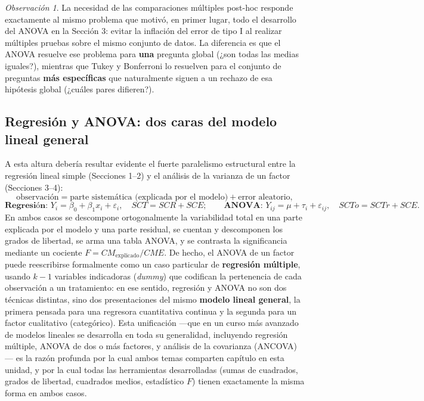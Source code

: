 \documentclass[11pt,a4paper]{article}
\theoremstyle{plain}
\theoremstyle{definition}
\theoremstyle{remark}
\newtheorem{observacion}[teorema]{Observación}
\begin{document}
\begin{observacion}
La necesidad de las comparaciones múltiples post-hoc responde exactamente al mismo problema que motivó, en primer lugar, todo el desarrollo del ANOVA en la Sección 3: evitar la inflación del error de tipo I al realizar múltiples pruebas sobre el mismo conjunto de datos. La diferencia es que el ANOVA resuelve ese problema para \textbf{una} pregunta global (¿son todas las medias iguales?), mientras que Tukey y Bonferroni lo resuelven para el conjunto de preguntas \textbf{más específicas} que naturalmente siguen a un rechazo de esa hipótesis global (¿cuáles pares difieren?).
\end{observacion}

\subsection{Regresión y ANOVA: dos caras del modelo lineal general}

A esta altura debería resultar evidente el fuerte paralelismo estructural entre la regresión lineal simple (Secciones 1--2) y el análisis de la varianza de un factor (Secciones 3--4):
\[
\text{observación} = \text{parte sistemática (explicada por el modelo)} + \text{error aleatorio},
\]
\[
\textbf{Regresión: } Y_i=\beta_0+\beta_1x_i+\varepsilon_i, \quad SCT=SCR+SCE; \qquad \textbf{ANOVA: } Y_{ij}=\mu+\tau_i+\varepsilon_{ij}, \quad SCTo=SCTr+SCE.
\]
En ambos casos se descompone ortogonalmente la variabilidad total en una parte explicada por el modelo y una parte residual, se cuentan y descomponen los grados de libertad, se arma una tabla ANOVA, y se contrasta la significancia mediante un cociente $F=CM_{\text{explicado}}/CME$. De hecho, el ANOVA de un factor puede reescribirse formalmente como un caso particular de \textbf{regresión múltiple}, usando $k-1$ variables indicadoras (\emph{dummy}) que codifican la pertenencia de cada observación a un tratamiento: en ese sentido, regresión y ANOVA no son dos técnicas distintas, sino dos presentaciones del mismo \textbf{modelo lineal general}, la primera pensada para una regresora cuantitativa continua y la segunda para un factor cualitativo (categórico). Esta unificación —que en un curso más avanzado de modelos lineales se desarrolla en toda su generalidad, incluyendo regresión múltiple, ANOVA de dos o más factores, y análisis de la covarianza (ANCOVA)— es la razón profunda por la cual ambos temas comparten capítulo en esta unidad, y por la cual todas las herramientas desarrolladas (sumas de cuadrados, grados de libertad, cuadrados medios, estadístico $F$) tienen exactamente la misma forma en ambos casos.
\end{document}
